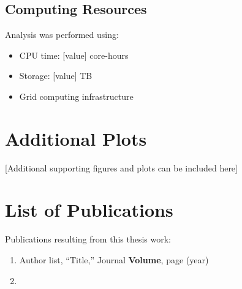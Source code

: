 \subsection{Computing Resources}

Analysis was performed using:
\begin{itemize}
  \item CPU time: [value] core-hours
  \item Storage: [value] TB
  \item Grid computing infrastructure
\end{itemize}

\section{Additional Plots}

[Additional supporting figures and plots can be included here]

\section{List of Publications}

Publications resulting from this thesis work:
\begin{enumerate}
  \item Author list, ``Title,'' Journal \textbf{Volume}, page (year)
  \item [Additional publications]
\end{enumerate}
